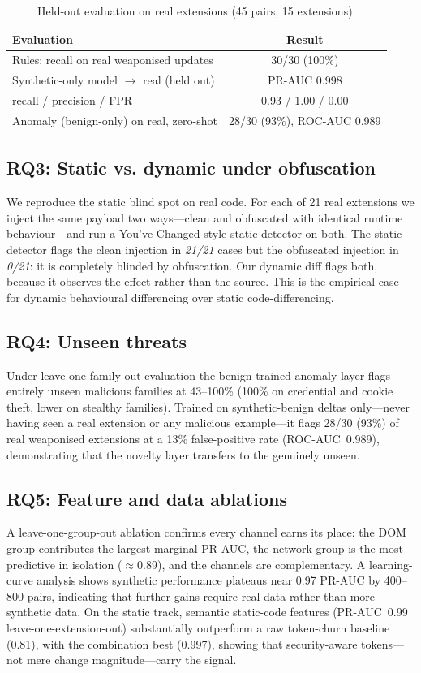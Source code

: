 \documentclass[conference]{IEEEtran}
\begin{document}
\begin{table}[t]
\caption{Held-out evaluation on real extensions (45 pairs, 15 extensions).}
\label{tab:real}
\centering
\footnotesize
\begin{tabular}{@{}lc@{}}
\toprule
\textbf{Evaluation} & \textbf{Result} \\
\midrule
Rules: recall on real weaponised updates & 30/30 (100\%) \\
Synthetic-only model $\rightarrow$ real (held out) & PR-AUC 0.998 \\
\quad recall / precision / FPR & 0.93 / 1.00 / 0.00 \\
Anomaly (benign-only) on real, zero-shot & 28/30 (93\%), ROC-AUC 0.989 \\
\bottomrule
\end{tabular}
\end{table}

\subsection{RQ3: Static vs. dynamic under obfuscation}
We reproduce the static blind spot on real code. For each of 21 real extensions we inject the same
payload two ways---clean and obfuscated with identical runtime behaviour---and run a You've
Changed-style static detector on both. The static detector flags the clean injection in
\emph{21/21} cases but the obfuscated injection in \emph{0/21}: it is completely blinded by
obfuscation. Our dynamic diff flags both, because it observes the effect rather than the source.
This is the empirical case for dynamic behavioural differencing over static code-differencing.

\subsection{RQ4: Unseen threats}
Under leave-one-family-out evaluation the benign-trained anomaly layer flags entirely unseen
malicious families at 43--100\% (100\% on credential and cookie theft, lower on stealthy
families). Trained on synthetic-benign deltas only---never having seen a real extension or any
malicious example---it flags 28/30 (93\%) of real weaponised extensions at a 13\% false-positive
rate (ROC-AUC~0.989), demonstrating that the novelty layer transfers to the genuinely unseen.

\subsection{RQ5: Feature and data ablations}
A leave-one-group-out ablation confirms every channel earns its place: the DOM group contributes
the largest marginal PR-AUC, the network group is the most predictive in isolation ($\approx$0.89),
and the channels are complementary. A learning-curve analysis shows synthetic performance
plateaus near 0.97 PR-AUC by 400--800 pairs, indicating that further gains require real data
rather than more synthetic data. On the static track, semantic static-code features (PR-AUC~0.99
leave-one-extension-out) substantially outperform a raw token-churn baseline (0.81), with the
combination best (0.997), showing that security-aware tokens---not mere change magnitude---carry
the signal.
\end{document}
